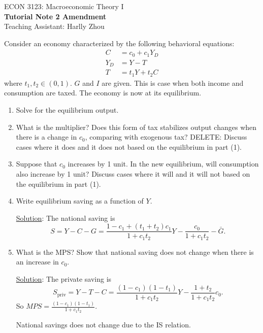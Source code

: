 \documentclass[12pt]{article}
\begin{document}
\begin{center}
    ECON 3123: Macroeconomic Theory I\\
    {\large \textbf{Tutorial Note 2 Amendment}}\\
    Teaching Assistant: Harlly Zhou
\end{center}

Consider an economy characterized by the following behavioral equations:
    \begin{align*}
        C &= c_0 + c_1 Y_D\\
        Y_D &= Y - T\\
        T &= t_1 Y + t_2 C
    \end{align*}
    where $t_1, t_2 \in (0,1)$. $G$ and $I$ are given. This is case when both income and consumption are taxed. The economy is now at its equilibrium.
    \begin{enumerate}[label=(\arabic*)]
        \item Solve for the equilibrium output.
        \item What is the multiplier? Does this form of tax stabilizes output changes when there is a change in $c_0$, comparing with exogenous tax? {\color{red} DELETE: Discuss cases where it does and it does not based on the equilibrium in part (1).}
        \item Suppose that $c_0$ increases by 1 unit. In the new equilibrium, will consumption also increase by 1 unit? Discuss cases where it will and it will not based on the equilibrium in part (1).
        \item Write equilibrium saving as a function of $Y$.
        
        \underline{Solution}: The national saving is
        \[S = Y - C - G = \frac{1 - c_1 + (t_1 + t_2)c_1}{1+c_1t_2}Y - \frac{c_0}{1+c_1t_2} - \bar{G}.\]

        \item What is the MPS? {\color{red} Show that national saving does not change when there is an increase in $c_0$.}
        
        \underline{Solution}: The private saving is
        \[S_{\text{priv}} = Y - T - C = \frac{(1-c_1)(1-t_1)}{1+c_1t_2}Y - \frac{1+t_2}{1+c_1t_2}c_0.\]
        So $MPS = \frac{(1-c_1)(1-t_1)}{1+c_1t_2}$.

        National savings does not change due to the IS relation.
    \end{enumerate} 
\end{document}
